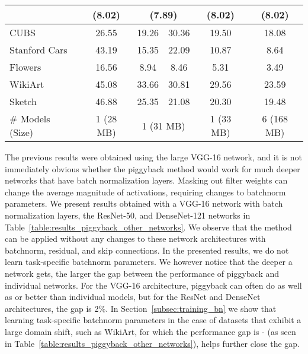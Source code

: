 \documentclass{llncs}
\begin{document}
\begin{table*}[th!]
\begin{tabular}{l||c|c|c|c|c}
    & (8.02) & \multicolumn{2}{c|}{(7.89)} & (8.02) & (8.02) \\\hline
    CUBS & 26.55 & 19.26 & 30.36 & 19.50 & 18.08 \\\hline
    Stanford Cars & 43.19 & 15.35 & 22.09 & 10.87 & 8.64 \\\hline
    Flowers & 16.56 & 8.94 & 8.46 & 5.31 & 3.49 \\\hline
    WikiArt & 45.08 & 33.66 & 30.81 & 29.56 & 23.59 \\\hline
    Sketch & 46.88 & 25.35 & 21.08 & 20.30 & 19.48 \\\hline\hline
    \# Models (Size) & 1 (28 MB) & \multicolumn{2}{c|}{1 (31 MB)} & 1 (33 MB) & 6 (168 MB)\\\hline
  \end{tabular}
  \caption{Results on other network architectures. Values in parentheses are top-5 errors, rest are top-1 errors.  and  indicate order of task addition for PackNet.}
  \label{table:results_piggyback_other_networks}
\end{table*}

The previous results were obtained using the large VGG-16 network, and it is not immediately obvious whether the piggyback method would work for much deeper networks that have batch normalization layers. Masking out filter weights can change the average magnitude of activations, requiring changes to batchnorm parameters. 
We present results obtained with a VGG-16 network with batch normalization layers, the ResNet-50, and DenseNet-121 networks in Table~\ref{table:results_piggyback_other_networks}.
We observe that the method can be applied without any changes to these network architectures with batchnorm, residual, and skip connections. In the presented results, we do not learn task-specific batchnorm parameters.
We however notice that the deeper a network gets, the larger the gap between the performance of piggyback and individual networks. For the VGG-16 architecture, piggyback can often do as well as or better than individual models, but for the ResNet and DenseNet architectures, the gap is 2\%.
In Section~\ref{subsec:training_bn} we show that learning task-specific batchnorm parameters in the case of datasets that exhibit a large domain shift, such as WikiArt, for which the performance gap is - (as seen in Table~\ref{table:results_piggyback_other_networks}), helps further close the gap. 





 
\end{document}
